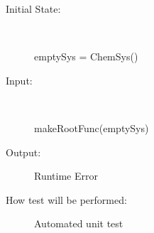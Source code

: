 \documentclass[12pt, titlepage]{article}
\begin{document}
\begin{addmargin}[2em]{0em}
\begin{addmargin}[2em]{0em}
\begin{description}
\item[Initial State:] ~\newline

\begin{python}
emptySys = ChemSys()
\end{python}
					
\item[Input:] ~\newline

\begin{python}
makeRootFunc(emptySys) 
\end{python}
					
\item[Output:] Runtime Error
					
\item[How test will be performed:] Automated unit test\\
\end{description}
\end{addmargin}

\end{addmargin}

\end{document}
